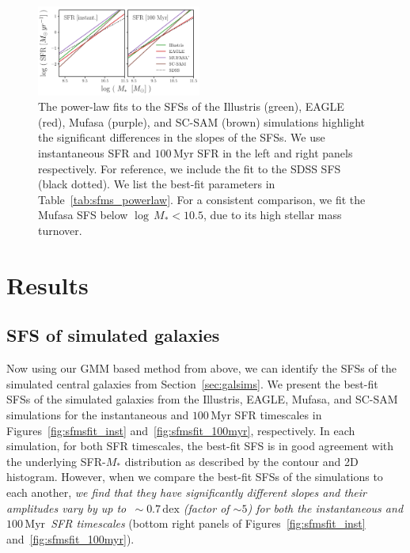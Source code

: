 \documentclass[tighten, preprint]{aastex62}
\newcommand{\hunmyr}{$100\,\mathrm{Myr}$}
\begin{document}
\begin{figure}
\begin{center}
\includegraphics[width = 0.48\textwidth]{Catalogs_SFMS_powerlawfit.pdf} 
\caption{The power-law fits to the SFSs of the Illustris (green), 
    EAGLE (red), {\sc Mufasa} (purple), and SC-SAM (brown) simulations
   	highlight the significant differences in the slopes of the SFSs.
    We use instantaneous SFR and $100\,\mathrm{Myr}$ SFR in the left
    and right panels respectively. For reference, we include the 
    fit to the SDSS SFS (black dotted). We list the best-fit parameters 
    in Table~\ref{tab:sfms_powerlaw}. For a consistent comparison, we 
    fit the {\sc Mufasa} SFS below $\log\,M_* < 10.5$, due to its high stellar mass turnover.} 
    \label{fig:sfmsfit_powerlaw}
\end{center}
\end{figure}

\section{Results} \label{sec:results}
\subsection{SFS of simulated galaxies} \label{sec:sfs}
Now using our GMM based method from above, %
we can identify the SFSs of the simulated central galaxies from 
Section~\ref{sec:galsims}. We present the best-fit SFSs of the 
simulated galaxies from the Illustris, EAGLE, {\sc Mufasa}, and SC-SAM 
simulations for the instantaneous and $100\,\mathrm{Myr}$ SFR 
timescales in Figures~\ref{fig:sfmsfit_inst} and~\ref{fig:sfmsfit_100myr}, 
respectively. In each simulation, for both SFR timescales, the best-fit SFS is 
in good agreement with the underlying SFR-$M_*$ distribution as described 
by the contour and 2D histogram. However, when we compare the best-fit SFSs 
of the simulations to each another, \emph{we find that they have significantly 
different slopes and their amplitudes vary by up to 
$\,{\sim}0.7\,\mathrm{dex}$ (factor of ${\sim}5$) 
for both the instantaneous and \hunmyr~SFR timescales} 
(bottom right panels of Figures~\ref{fig:sfmsfit_inst} and~\ref{fig:sfmsfit_100myr}).
\end{document}
